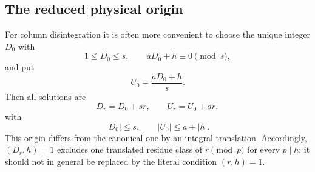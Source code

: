 \subsection{The reduced physical origin}

For column disintegration it is often more convenient to choose the unique
integer \(D_0\) with
\begin{equation}
 1\le D_0\le s,\qquad aD_0+h\equiv0\pmod s,
 \label{eq:tpc33-reduced-origin-D}
\end{equation}
and put
\begin{equation}
 U_0=\frac{aD_0+h}{s}.
 \label{eq:tpc33-reduced-origin-U}
\end{equation}
Then all solutions are
\begin{equation}
 D_r=D_0+sr,\qquad U_r=U_0+ar,
 \label{eq:tpc33-reduced-origin-forms}
\end{equation}
with
\begin{equation}
 |D_0|\le s,\qquad |U_0|\le a+|h|.
 \label{eq:tpc33-reduced-intercept-bounds}
\end{equation}
This origin differs from the canonical one by an integral translation.
Accordingly, \((D_r,h)=1\) excludes one translated residue class of
\(r\pmod p\) for every \(p\mid h\); it should not in general be replaced
by the literal condition \((r,h)=1\).
